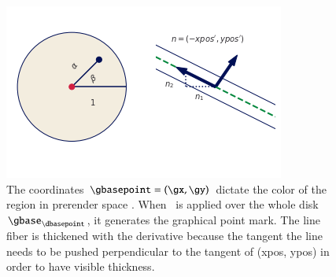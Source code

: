 \documentclass[journal]{vgtc}                %
\begin{document}
\begin{figure}
  \centering
  \includegraphics[width=\columnwidth]{base_q}
  \caption{The coordinates \(\gbasepoint=(\gx, \gy)\) dictate the color of the region in prerender space \gbase. When \vmark\ is applied over the whole disk \(\gbase_{\dbasepoint}\), it generates the graphical point mark. The line fiber is thickened with the derivative because the tangent the line needs to be pushed perpendicular to the tangent of (xpos, ypos) in order to have visible thickness.}
  \label{fig:math:artist:base}
\end{figure}
\end{document}
